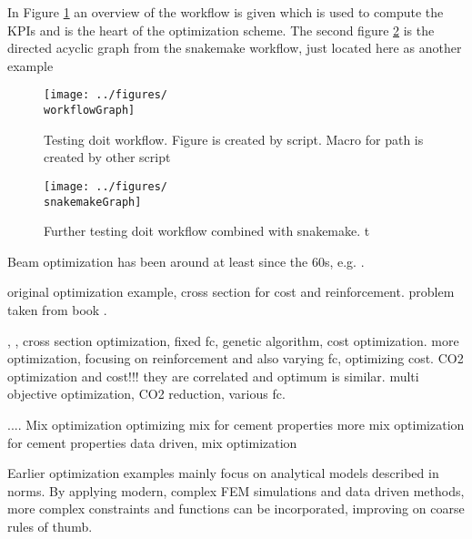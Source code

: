 In Figure \ref{fig:workflow} an overview of the workflow is given which is used to compute the KPIs and is the heart of the optimization scheme.
The second figure \ref{fig:snakemake_workflow} is the directed acyclic graph from the snakemake workflow, just located here as another example
\begin{figure}[ht]%
	\centering
	\texttt{[image: ../figures/\\workflowGraph]}
	\caption{Testing doit workflow. Figure is created by script. Macro for path is created by other script}\label{fig:workflow}
\end{figure}
\begin{figure}[ht]%
\centering
\texttt{[image: ../figures/\\snakemakeGraph]}
\caption{Further testing doit workflow combined with snakemake. t}\label{fig:snakemake_workflow}
\end{figure}

Beam optimization has been around at least since the 60s, e.g. \cite{Haung1967}.

\cite{Chakrabarty_1992} original optimization example, cross section for cost and reinforcement.
problem taken from book \cite{everard1966reinforced}.

\cite{Coello_1997} , , cross section optimization, fixed fc, genetic algorithm, cost optimization.
\cite{Pierott_2021} more optimization, focusing on reinforcement and also varying fc, optimizing cost.
\cite{Paya_Zaforteza_2009} CO2 optimization and cost!!! they are correlated and optimum is similar.
\cite{dos_Santos_2023} multi objective optimization, CO2 reduction, various fc.

....
Mix optimization
\cite{Lisienkova_2021} optimizing mix for cement properties
\cite{Kondapally_2022} more mix optimization for cement properties
\cite{Shobeiri_2023} data driven, mix optimization



Earlier optimization examples mainly focus on analytical models described in norms.
By applying modern, complex FEM simulations and data driven methods, more complex constraints and functions can be incorporated, improving on coarse rules of thumb.


